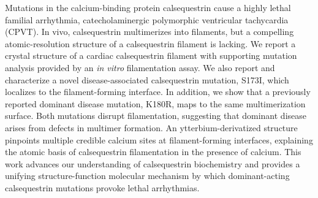 Mutations in the calcium-binding protein calsequestrin cause a highly lethal familial arrhythmia, catecholaminergic polymorphic ventricular tachycardia (CPVT). In vivo, calsequestrin multimerizes into filaments, but a compelling atomic-resolution structure of a calsequestrin filament is lacking. We report a crystal structure of a cardiac calsequestrin filament with supporting mutation analysis provided by an \textit{in vitro} filamentation assay. We also report and characterize a novel disease-associated calsequestrin mutation, S173I, which localizes to the filament-forming interface. In addition, we show that a previously reported dominant disease mutation, K180R, maps to the same multimerization surface. Both mutations disrupt filamentation, suggesting that dominant disease arises from defects in multimer formation. An ytterbium-derivatized structure pinpoints multiple credible calcium sites at filament-forming interfaces, explaining the atomic basis of calsequestrin filamentation in the presence of calcium. This work advances our understanding of calsequestrin biochemistry and provides a unifying structure-function molecular mechanism by which dominant-acting calsequestrin mutations provoke lethal arrhythmias.